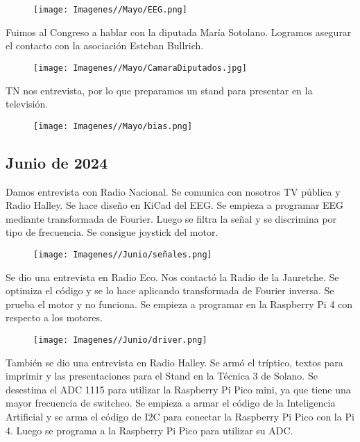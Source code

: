 \documentclass{article}
\begin{document}
\begin{figure}[H]
    \centering
    \texttt{[image: Imagenes//Mayo/EEG.png]}
\end{figure}

\newpage

Fuimos al Congreso a hablar con la diputada María Sotolano. Logramos asegurar el contacto con la asociación Esteban Bullrich.

\begin{figure}[H]
    \centering
    \texttt{[image: Imagenes//Mayo/CamaraDiputados.jpg]}
\end{figure}

TN nos entrevista, por lo que preparamos un stand para presentar en la televisión.

\begin{figure}[H]
    \centering
    \texttt{[image: Imagenes//Mayo/bias.png]}
\end{figure}

\newpage


\begin{center}
    \section{Junio de 2024}
\end{center}

Damos entrevista con Radio Nacional. Se comunica con nosotros TV pública y Radio Halley. Se hace diseño en KiCad del EEG. Se empieza a programar EEG mediante transformada de Fourier. Luego se filtra la señal y se discrimina por tipo de frecuencia. Se consigue joystick del motor.

\begin{figure}[H]
    \centering
    \texttt{[image: Imagenes//Junio/señales.png]}
\end{figure}

\newpage

Se dio una entrevista en Radio Eco. Nos contactó la Radio de la Jauretche. Se optimiza el código y se lo hace aplicando transformada de Fourier inversa. Se prueba el motor y no funciona. Se empieza a programar en la Raspberry Pi 4 con respecto a los motores.

\begin{figure}[H]
    \centering
    \texttt{[image: Imagenes//Junio/driver.png]}
\end{figure}

También se dio una entrevista en Radio Halley. Se armó el tríptico, textos para imprimir y las presentaciones para el Stand en la Técnica 3 de Solano. Se desestima el ADC 1115 para utilizar la Raspberry Pi Pico mini, ya que tiene una mayor frecuencia de switcheo. Se empieza a armar el código de la Inteligencia Artificial y se arma el código de I2C para conectar la Raspberry Pi Pico con la Pi 4. Luego se programa a la Raspberry Pi Pico para utilizar su ADC.
\end{document}
